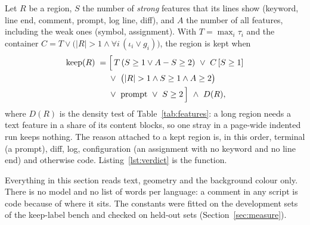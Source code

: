Let $R$ be a region, $S$ the number of \emph{strong} features that its lines show (keyword, line end, comment, prompt, log
line, diff), and $A$ the number of all features, including the weak ones (symbol, assignment). With $T=\max_i\tau_i$ and the
container $C=T\lor\bigl(|R|>1\land\forall i\,(\iota_i\lor g_i)\bigr)$, the region is kept when
\begin{equation}\label{eq:verdict}
\begin{aligned}
\mathrm{keep}(R)\;=\;&\Bigl[\,T\,(S\ge1\lor A-S\ge2)\ \lor\ C\,[S\ge1]\\
&\lor\ \bigl(|R|>1\land S\ge1\land A\ge2\bigr)\\
&\lor\ \mathrm{prompt}\ \lor\ S\ge2\,\Bigr]\ \land\ D(R),
\end{aligned}
\end{equation}
where $D(R)$ is the density test of Table~\ref{tab:features}: a long region needs a text feature in a share of its content blocks,
so one stray  in a page-wide indented run keeps nothing. The reason attached to a kept region is, in this order,
terminal (a prompt), diff, log, configuration (an assignment with no keyword and no line end) and otherwise code. Listing~\ref{lst:verdict}
is the function.

\begin{listing}[t]

\caption{, \texttt{Core/Sources/MwoyeoCore/CodeRegion.swift}, lines 251--267, as it is in the
repository.}\label{lst:verdict}
\end{listing}

Everything in this section reads text, geometry and the background colour only. There is no model and no list of words per language: a comment in any
script is code because of where it sits. The constants were fitted on the development sets of the keep-label bench and
checked on held-out sets (Section~\ref{sec:measure}).
